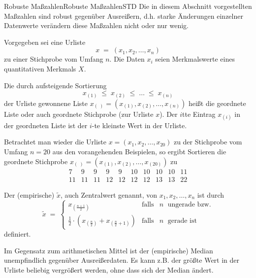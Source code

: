 \begin{MXContent}{Robuste Maßzahlen}{Robuste Maßzahlen}{STD}
Die in diesem Abschnitt vorgestellten Maßzahlen sind robust gegenüber Ausreißern, d.h. starke Änderungen einzelner Datenwerte verändern diese Maßzahlen nicht oder nur wenig.

Vorgegeben sei eine Urliste
$$
x\; =\;(x_{1},x_{2},\ldots ,x_{n})
$$
zu einer Stichprobe vom Umfang $n$. Die Daten $x_{i}$ seien Merkmalswerte eines quantitativen Merkmals $X$.

\begin{MInfo}
Die durch aufsteigende Sortierung
$$
x_{(1)}\;\leq\; x_{(2)}\;\leq \;\ldots\;\leq\; x_{(n)}
$$
der Urliste gewonnene Liste $x_{(\; )}=(x_{(1)},x_{(2)},\ldots ,x_{(n)})$
heißt die geordnete Liste oder auch geordnete Stichprobe (zur Urliste $x$). Der $i$tte Eintrag $x_{(i)}$ in der geordneten Liste ist der $i$-te kleinste Wert in der Urliste.
\end{MInfo}

\begin{MExample}
Betrachtet man wieder die Urliste $x=(x_{1},x_{2},\ldots ,x_{20})$ zu der Stichprobe vom Umfang $n=20$
aus den vorangehenden Beispielen, so ergibt Sortieren die geordnete Stichprobe
$x_{(\; )}=(x_{(1)},x_{(2)},\ldots ,x_{(20)})$ zu
$$
\begin{array}{cccccccccc} 7 & 9 & 9 & 9 & 9 & 10 & 10 & 10 & 10 & 11 \\ 11 & 11 & 11 & 12 & 12 & 12 & 12 & 13 & 13 & 22 \end{array}
$$
\end{MExample}

\begin{MInfo}
Der (empirische)  $\tilde{x}$, auch Zentralwert genannt, von $x_{1},x_{2},\ldots ,x_{n}$ ist durch
$$
\tilde{x}\;=\;\left\lbrace{\begin{array}{lll}x_{\left(\frac{n+1}{2}\right)} & \text{falls} & n\;\text{ ungerade bzw.}\\
\frac{1}{2}\cdot \left( x_{(\frac{n}{2})}+ x_{(\frac{n}{2}+1)} \right) & \text{falls} &n\;\text{ gerade ist}\end{array}}\right.
$$
definiert.
\end{MInfo}

Im Gegensatz zum arithmetischen Mittel ist der (empirische) Median unempfindlich gegenüber Ausreißerdaten.
Es kann z.B. der größte Wert in der Urliste beliebig vergrößert werden, ohne dass sich der Median ändert.


\end{MXContent}
